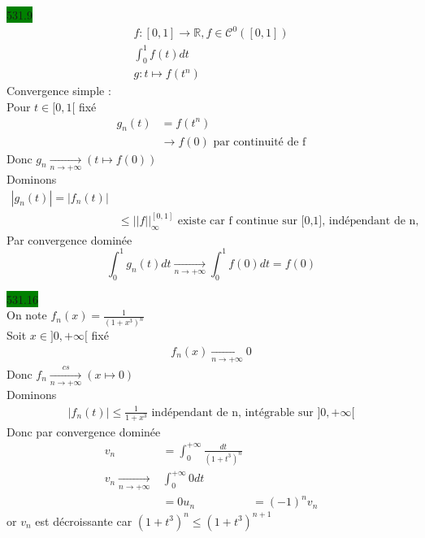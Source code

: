 \documentclass{article}
\begin{document}
\noindent \colorbox{green}{531.9}\\
\begin{align*}
  f:[0,1] \rightarrow \mathbb{R}, f \in \mathcal{C}^{0}([0,1])\\ 
  \int_{0}^{1} f(t) dt \\
  g : t \mapsto f(t^{n})
\end{align*}
Convergence simple : \\
Pour \(t \in [0,1[\) fixé\\ 
\begin{align*}
  g_{n}(t) &= f(t^{n})\\
           &\rightarrow f(0) \text{ par continuité de f}
\end{align*}
Donc \(g_{n}\xrightarrow[n \to +\infty]{} (t \mapsto f(0))\)\\
Dominons \\
\begin{align*}
    |g_{n}(t)| = |f_{n}(t)| \\
    &\leq ||f||_{\infty}^{[0,1]} \text{ existe car f continue sur [0,1], indépendant de n, intégrable sur segment [0,1]}
\end{align*}
Par convergence dominée\\
\begin{equation*}
    \int_{0}^{1} g_{n}(t)dt \xrightarrow[n \rightarrow +\infty]{} \int_{0}^{1}f(0)dt = f(0)
\end{equation*}

\noindent \colorbox{green}{531.16}\\
On note \(f_{n}(x) = \frac{1}{(1+x^{3})^{n}}\)\\
Soit \(x \in ]0, +\infty[\) fixé
\begin{align*}
   f_{n}(x)  \xrightarrow[n \rightarrow +\infty]{} 0
\end{align*}
Donc \(f_{n} \xrightarrow[n \rightarrow +\infty]{cs} (x \mapsto 0)\)\\
Dominons \\
\begin{align*}
  |f_{n}(t)| \leq \frac{1}{1+x^{3}} \text{ indépendant de n, intégrable sur } ]0, +\infty[
\end{align*}
Donc par convergence dominée
\begin{align*}
  v_{n} &= \int_{0}^{+\infty}\frac{dt }{(1+t^{3})^{n}}\\
    v_{n}  \xrightarrow[n \rightarrow +\infty]{} &\int_{0}^{+\infty} 0 dt \\
    &= 0
    u_{n} &= (-1)^{n}v_{n}
\end{align*}
or \(v_{n}\) est décroissante car \((1 + t^{3})^{n} \leq (1+t^{3})^{n+1}\)
\end{document}

